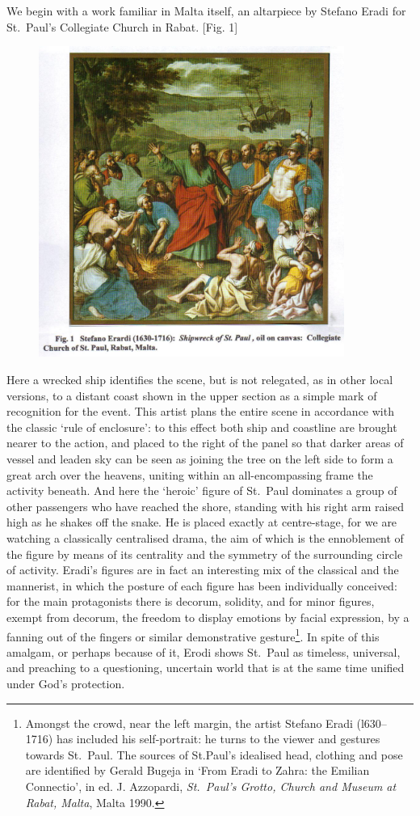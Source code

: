 \documentclass[a4paper,12pt]{article}
\begin{document}
We begin with a work familiar in Malta itself, an altarpiece by
Stefano Eradi for St.~Paul's Collegiate Church in Rabat. [Fig. 1] 
\begin{figure}[htbp]
\centering
\includegraphics[width=10cm]{fig1.jpg}
\end{figure}
Here
a wrecked ship identifies the scene, but is not relegated, as in other
local versions, to a distant coast shown in the upper section as a
simple mark of recognition for the event.  This artist plans the
entire scene in accordance with the classic `rule of enclosure': to
this effect both ship and coastline are brought nearer to the action,
and placed to the right of the panel so that darker areas of vessel
and leaden sky can be seen as joining the tree on the left side to
form a great arch over the heavens, uniting within an all-encompassing
frame the activity beneath.  And here the `heroic' figure of St.~Paul
dominates a group of other passengers who have reached the shore,
standing with his right arm raised high as he shakes off the snake.
He is placed exactly at centre-stage, for we are watching a
classically centralised drama, the aim of which is the ennoblement of
the figure by means of its centrality and the symmetry of the
surrounding circle of activity.  Eradi's figures are in fact an
interesting mix of the classical and the mannerist, in which the
posture of each figure has been individually conceived: for the main
protagonists there is decorum, solidity, and for minor figures, exempt
from decorum, the freedom to display emotions by facial expression, by
a fanning out of the fingers or similar demonstrative
gesture\footnote{Amongst the crowd, near the left margin, the artist
  Stefano Eradi (l630--1716) has included his self-portrait: he turns
  to the viewer and gestures towards St.~Paul.  The sources of
  St.Paul's idealised head, clothing and pose are identified by Gerald
  Bugeja in `From Eradi to Zahra: the Emilian Connectio', in
  ed. J. Azzopardi, \textit{St.~Paul's Grotto, Church and Museum at
    Rabat, Malta}, Malta 1990.  }. In spite of this amalgam, or
perhaps because of it, Erodi shows St.~Paul as timeless, universal,
and preaching to a questioning, uncertain world that is at the same
time unified under God's protection.
\end{document}
